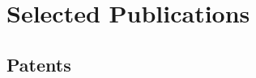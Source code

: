 

%

\section{Selected Publications}

\setlength{}







\subsection{Patents}
\begin{refsection}
\nocite{*}
\printbibliography[heading=none,sorting=ynt]
\end{refsection}
    
